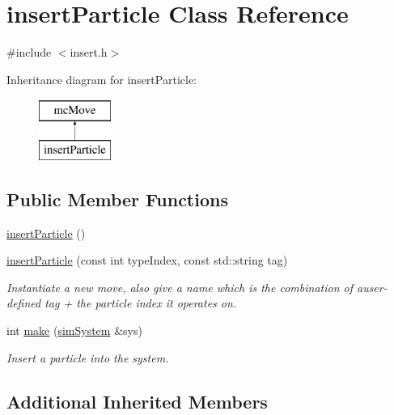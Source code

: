 \hypertarget{classinsert_particle}{\section{insert\-Particle Class Reference}
\label{classinsert_particle}
}


{\ttfamily \#include $<$insert.\-h$>$}

Inheritance diagram for insert\-Particle\-:\begin{figure}[H]
\begin{center}
\leavevmode
\includegraphics[height=2.000000cm]{classinsert_particle}
\end{center}
\end{figure}
\subsection*{Public Member Functions}
\begin{DoxyCompactItemize}
\item 
\hyperlink{classinsert_particle_adc56d982ad9d43537aea2744d13c3471}{insert\-Particle} ()
\item 
\hyperlink{classinsert_particle_af528d2c24fff7bea0701b014ae2fa5e4}{insert\-Particle} (const int type\-Index, const std\-::string tag)
\begin{DoxyCompactList}\small\item\em Instantiate a new move, also give a name which is the combination of auser-\/defined tag + the particle index it operates on. \end{DoxyCompactList}\item 
int \hyperlink{classinsert_particle_ad81c09b735d1acea65758242d5c5d595}{make} (\hyperlink{classsim_system}{sim\-System} \&sys)
\begin{DoxyCompactList}\small\item\em Insert a particle into the system. \end{DoxyCompactList}\end{DoxyCompactItemize}
\subsection*{Additional Inherited Members}


